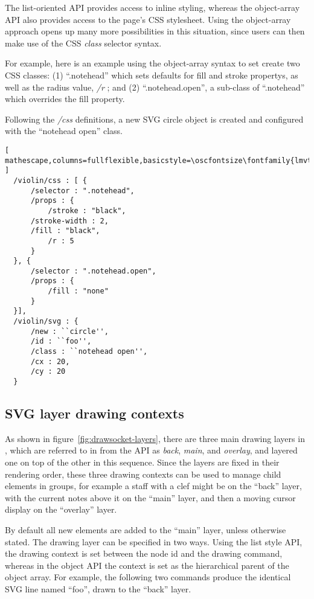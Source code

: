The list-oriented API provides access to inline styling, whereas the object-array API also provides access to the page's CSS stylesheet.
Using the object-array approach opens up many more possibilities in this situation, since users can then make use of the CSS \textit{class} selector syntax.

For example, here is an example using the object-array syntax to set create two CSS classes: (1) ``.notehead'' which sets defaults for fill and stroke propertys, as well as the radius value, \textit{/r} ; and (2) ``.notehead.open'', a sub-class of ``.notehead'' which overrides the fill property. 

Following the \textit{/css} definitions, a new SVG circle object is created and configured with the ``notehead open'' class.

\begin{lstlisting}[ mathescape,columns=fullflexible,basicstyle=\oscfontsize\fontfamily{lmvtt}\selectfont ]
  /violin/css : [ {
      /selector : ".notehead",
      /props : {
          /stroke : "black",
	  /stroke-width : 2,
	  /fill : "black",
          /r : 5
      }
  }, {
      /selector : ".notehead.open",
      /props : {
          /fill : "none"
      }
  }],
  /violin/svg : {
      /new : ``circle'',
      /id : ``foo'',
      /class : ``notehead open'',
      /cx : 20,
      /cy : 20
  }
 \end{lstlisting}


\subsection{SVG layer drawing contexts}\label{sec:contexts}
As shown in figure~\ref{fig:drawsocket-layers}, there are three main drawing layers in \drawsocket, which are referred to in from the API as \textit{back}, \textit{main}, and \textit{overlay}, and layered one on top of the other in this sequence.
Since the layers are fixed in their rendering order, these three drawing contexts can be used to manage child elements in groups, for example a staff with a clef might be on the ``back'' layer, with the current notes above it on the ``main'' layer, and then a moving cursor display on the ``overlay'' layer.

By default all new elements are added to the ``main'' layer, unless otherwise stated. The drawing layer can be specified in two ways. Using the list style API, the drawing context is set between the node id and the drawing command, whereas in the object API the context is set as the hierarchical parent of the object array. 
For example, the following two commands produce the identical SVG line named ``foo'', drawn to the ``back'' layer.

